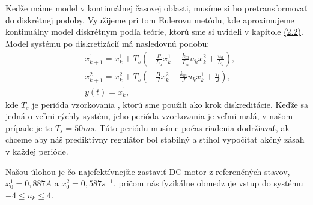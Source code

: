 Keďže máme model v kontinuálnej časovej oblasti, musíme si ho pretransformovať do diskrétnej podoby. Využijeme pri tom Eulerovu metódu, kde aproximujeme kontinuálny model diskrétnym podľa teórie, ktorú sme si uvideli v kapitole \hyperref[se:diskretizacia]{(2.2)}. Model systému po diskretizácií má nasledovnú podobu:
\begin{subequations}
\begin{align}
& x_{k+1}^{1} = x^{1}_{k}+T_{s}\left(- \frac{R}{L_{a}}x^{1}_{k} - \frac{k_{m}}{L_{a}}u_{k}x^{2}_{k} + \frac{u_a}{L_a}\right),\\
& x_{k+1}^{2} = x^{2}_{k}+T_{s}\left(- \frac{B}{J}x^{2}_{k} - \frac{k_{m}}{J}u_{k}x^{1}_{k} + \frac{\tau_l}{J}\right),\\
& y(t) = x^{1}_{k},
\end{align}
\end{subequations}
kde $T_{s}$ je perióda vzorkovania , ktorú sme použili ako krok diskreditácie. Keďže sa jedná o veľmi rýchly systém, jeho perióda vzorkovania je veľmi malá, v našom prípade je to $T_{s} = 50ms$. Túto periódu musíme počas riadenia dodržiavať, ak chceme aby náš prediktívny regulátor bol stabilný a stihol vypočítať akčný zásah v každej perióde.

Našou úlohou je čo najefektívnejšie zastaviť DC motor z referenčných stavov, $x_{0}^{1}=0,887 A$ a $x_{0}^{2}=0,587 s^{-1}$, pričom nás fyzikálne obmedzuje vstup do systému $-4 \leq u_{k} \leq 4$. 

